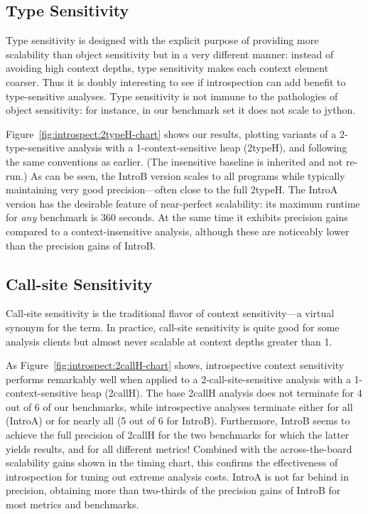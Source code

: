 \subsection{Type Sensitivity}
Type sensitivity is designed with the explicit purpose of providing more scalability than object sensitivity but in a very different manner: instead of avoiding high context depths, type sensitivity makes each context element coarser. Thus it is doubly interesting to see if introspection can add benefit to type-sensitive analyses. Type sensitivity is not immune to the pathologies of object sensitivity: for instance, in our benchmark set it does not scale to jython. 

Figure~\ref{fig:introspect:2typeH-chart} shows our results, plotting variants of a 2-type-sensitive analysis with a 1-context-sensitive heap (2typeH), and following the same conventions as earlier. (The insensitive baseline is inherited and not re-run.) As can be seen, the IntroB version scales to all programs while typically maintaining very good precision---often close to the full 2typeH. The IntroA version has the desirable feature of near-perfect scalability: its maximum runtime for \emph{any} benchmark is 360 seconds. At the same time it exhibits precision gains compared to a context-insensitive analysis, although these are noticeably lower than the precision gains of IntroB.


\subsection{Call-site Sensitivity}
Call-site sensitivity is the traditional flavor of context sensitivity---a virtual synonym for the term. In practice, call-site sensitivity is quite good for some analysis clients but almost never scalable at context depths greater than 1. 

As Figure~\ref{fig:introspect:2callH-chart} shows, introspective context sensitivity performs remarkably well when applied to a 2-call-site-sensitive analysis with a 1-context-sensitive heap (2callH). The base 2callH analysis does not terminate for 4 out of 6 of our benchmarks, while introspective analyses terminate either for all (IntroA) or for nearly all (5 out of 6 for IntroB). Furthermore, IntroB seems to achieve the full precision of 2callH for the two benchmarks for which the latter yields results, and for all different metrics! Combined with the across-the-board scalability gains shown in the timing chart, this confirms the effectiveness of introspection for tuning out extreme analysis costs. IntroA is not far behind in precision, obtaining more than two-thirds of the precision gains of IntroB for most metrics and benchmarks.


